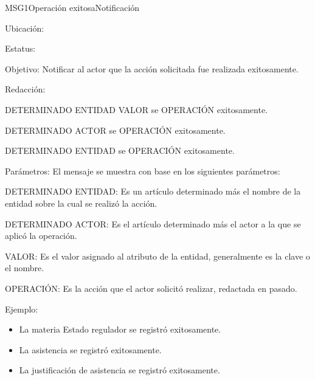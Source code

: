 \begin{mensaje}{MSG1}{Operación exitosa}{Notificación}
	\item[Ubicación:] \msjSuperior
	\item[Estatus:] %
	\item[Objetivo:] Notificar al actor que la acción solicitada fue realizada exitosamente.
	\item[Redacción:]
	\begin{Citemize}
		\item
		DETERMINADO ENTIDAD VALOR se OPERACIÓN exitosamente.
		\item
		DETERMINADO ACTOR se OPERACIÓN exitosamente.
		\item
		DETERMINADO ENTIDAD se OPERACIÓN exitosamente.
	\end{Citemize}
	\item[Parámetros:] El mensaje se muestra con base en los siguientes parámetros:
	\begin{Citemize}
		\item DETERMINADO ENTIDAD: Es un artículo determinado más el nombre de la entidad sobre la cual se realizó la acción.
		\item DETERMINADO ACTOR: Es el artículo determinado más el actor a la que se aplicó la operación.
		\item VALOR: Es el valor asignado al atributo de la entidad, generalmente es la clave o el nombre.
		\item OPERACIÓN: Es la acción que el actor solicitó realizar, redactada en pasado.
	\end{Citemize}
	\item[Ejemplo:] 
	\begin{itemize}
		\item La materia Estado regulador se registró exitosamente.
		\item La asistencia se registró exitosamente.
		\item La justificación de asistencia se registró exitosamente. 
	\end{itemize}
	
\end{mensaje}

